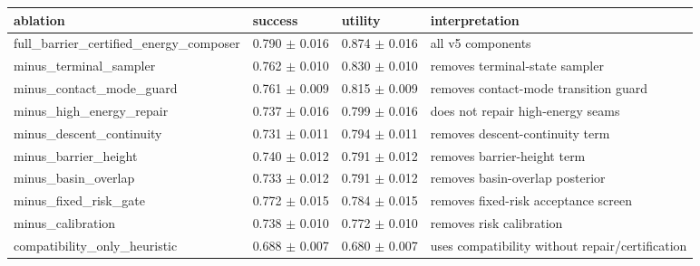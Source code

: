 \begin{tabular}{llll}
\toprule
ablation & success & utility & interpretation \\
\midrule
full\_barrier\_certified\_energy\_composer & 0.790 $\pm$ 0.016 & 0.874 $\pm$ 0.016 & all v5 components \\
minus\_terminal\_sampler & 0.762 $\pm$ 0.010 & 0.830 $\pm$ 0.010 & removes terminal-state sampler \\
minus\_contact\_mode\_guard & 0.761 $\pm$ 0.009 & 0.815 $\pm$ 0.009 & removes contact-mode transition guard \\
minus\_high\_energy\_repair & 0.737 $\pm$ 0.016 & 0.799 $\pm$ 0.016 & does not repair high-energy seams \\
minus\_descent\_continuity & 0.731 $\pm$ 0.011 & 0.794 $\pm$ 0.011 & removes descent-continuity term \\
minus\_barrier\_height & 0.740 $\pm$ 0.012 & 0.791 $\pm$ 0.012 & removes barrier-height term \\
minus\_basin\_overlap & 0.733 $\pm$ 0.012 & 0.791 $\pm$ 0.012 & removes basin-overlap posterior \\
minus\_fixed\_risk\_gate & 0.772 $\pm$ 0.015 & 0.784 $\pm$ 0.015 & removes fixed-risk acceptance screen \\
minus\_calibration & 0.738 $\pm$ 0.010 & 0.772 $\pm$ 0.010 & removes risk calibration \\
compatibility\_only\_heuristic & 0.688 $\pm$ 0.007 & 0.680 $\pm$ 0.007 & uses compatibility without repair/certification \\
\bottomrule
\end{tabular}
